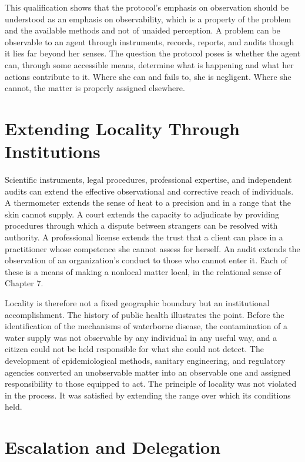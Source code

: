 \documentclass[11pt]{report}
\theoremstyle{definition}
\theoremstyle{remark}
\begin{document}
This qualification shows that the protocol's emphasis on observation should be understood as an emphasis on observability, which is a property of the problem and the available methods and not of unaided perception. A problem can be observable to an agent through instruments, records, reports, and audits though it lies far beyond her senses. The question the protocol poses is whether the agent can, through some accessible means, determine what is happening and what her actions contribute to it. Where she can and fails to, she is negligent. Where she cannot, the matter is properly assigned elsewhere.

\section{Extending Locality Through Institutions}

Scientific instruments, legal procedures, professional expertise, and independent audits can extend the effective observational and corrective reach of individuals. A thermometer extends the sense of heat to a precision and in a range that the skin cannot supply. A court extends the capacity to adjudicate by providing procedures through which a dispute between strangers can be resolved with authority. A professional license extends the trust that a client can place in a practitioner whose competence she cannot assess for herself. An audit extends the observation of an organization's conduct to those who cannot enter it. Each of these is a means of making a nonlocal matter local, in the relational sense of Chapter 7.

Locality is therefore not a fixed geographic boundary but an institutional accomplishment. The history of public health illustrates the point. Before the identification of the mechanisms of waterborne disease, the contamination of a water supply was not observable by any individual in any useful way, and a citizen could not be held responsible for what she could not detect. The development of epidemiological methods, sanitary engineering, and regulatory agencies converted an unobservable matter into an observable one and assigned responsibility to those equipped to act. The principle of locality was not violated in the process. It was satisfied by extending the range over which its conditions held.

\section{Escalation and Delegation}
\end{document}
